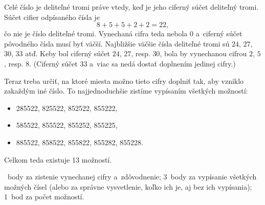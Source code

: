 {%
Celé číslo je deliteľné tromi práve vtedy, keď je jeho ciferný súčet
deliteľný tromi.
Súčet cifier odpísaného čísla je
$$
8+5+5+2+2=22,
$$
čo nie je číslo deliteľné tromi.
Vynechaná cifra teda nebola $0$ a~ciferný súčet pôvodného čísla musí byť
väčší.
Najbližšie väčšie čísla deliteľné tromi sú $24$, $27$, $30$, $33$ atď.
Keby bol ciferný súčet $24$, $27$, resp. $30$, bola by vynechanou cifrou $2$, $5$,
resp. $8$.
(Ciferný súčet $33$ a~viac sa nedá dostať doplnením jedinej cifry.)

Teraz treba určiť, na ktoré miesta možno tieto cifry doplniť tak, aby
vzniklo zakaždým iné číslo.
To najjednoduchšie zistíme vypísaním všetkých možností:
\begin{itemize}
\item 285522, 825522, 852522, 855222,
\item 585522, 855522, 855252, 855225,
\item 885522, 858522, 855822, 855282, 855228.
\end{itemize}
Celkom teda existuje 13 možností.

~body za zistenie vynechanej cifry a~zdôvodnenie;
3~body za vypísanie všetkých možných čísel (alebo za správne vysvetlenie, koľko ich je, aj bez ich vypísania);
1~bod za počet možností.
\endhodnotenie
}

